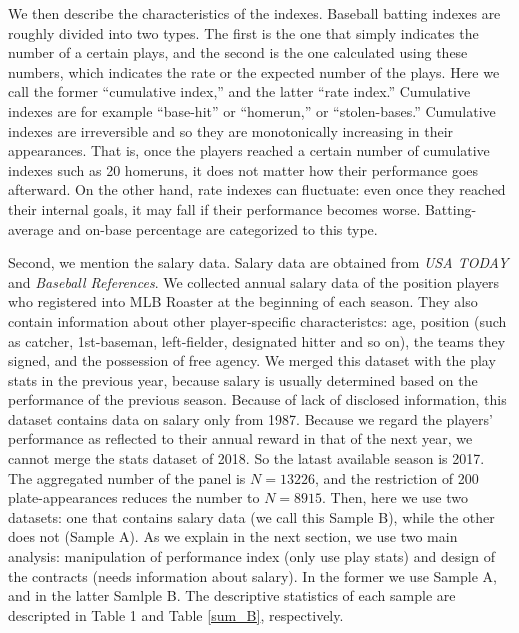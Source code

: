 \documentclass[dvipdfmx, 12pt]{article}
\begin{document}
We then describe the characteristics of the indexes. Baseball batting indexes are roughly divided into two types. The first is the one that simply indicates the number of a certain plays, and the second is the one calculated using these numbers, which indicates the rate or the expected number of the plays. Here we call the former ``cumulative index,'' and the latter ``rate index.'' Cumulative indexes are for example ``base-hit'' or ``homerun,'' or ``stolen-bases.'' Cumulative indexes are irreversible and so they are monotonically increasing in their appearances. That is, once the players reached a certain number of cumulative indexes such as 20 homeruns, it does not matter how their performance goes afterward. On the other hand, rate indexes can fluctuate: even once they reached their internal goals, it may fall if their performance becomes worse. Batting-average and on-base percentage are categorized to this type.

Second, we mention the salary data. Salary data are obtained from \textit{USA TODAY} and \textit{Baseball References}. We collected annual salary data of the position players who registered into MLB Roaster at the beginning of each season. They also contain information about other player-specific characteristcs: age, position (such as catcher, 1st-baseman, left-fielder, designated hitter and so on), the teams they signed, and the possession of free agency. We merged this dataset with the play stats in the previous year, because salary is usually determined based on the performance of the previous season. Because of lack of disclosed information, this dataset contains data on salary only from 1987. Because we regard the players' performance as reflected to their annual reward in that of the next year, we cannot merge the stats dataset of 2018. So the latast available season is 2017. The aggregated number of the panel is $N=13226$, and the restriction of 200 plate-appearances reduces the number to $N=8915$. Then, here we  use two datasets: one that contains salary data (we call this Sample B), while the other does not (Sample A). As we explain in the next section, we use two main analysis: manipulation of performance index (only use play stats) and design of the contracts (needs information about salary). In the former we use Sample A, and in the latter Samlple B. The descriptive statistics of each sample are descripted in Table 1 and Table \ref{sum_B}, respectively.

\begin{table}
  
\end{table}
\end{document}
